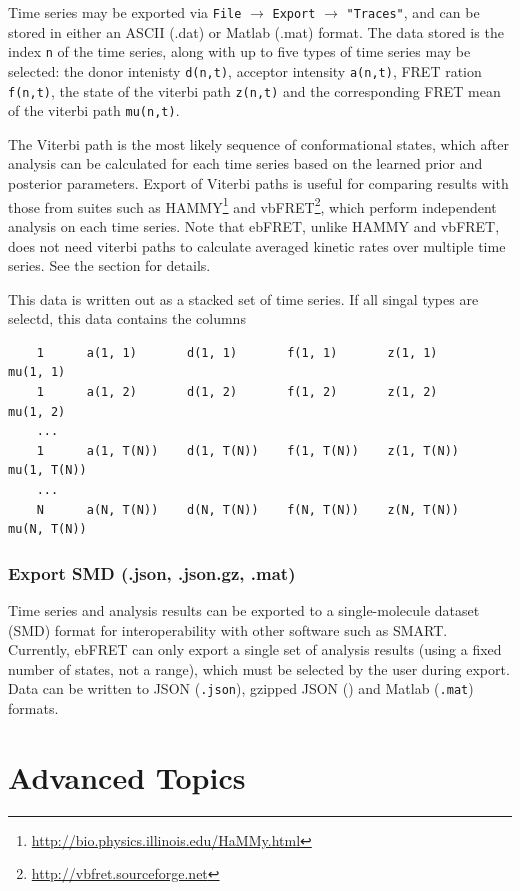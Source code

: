 \documentclass[12pt,article,oldfontcommands]{memoir}
\begin{document}
Time series may be exported via \texttt{File} $\to$ \texttt{Export} $\to$ \texttt{"Traces"}, and can be stored in either an ASCII (.dat) or Matlab (.mat) format. 
The data stored is the index \texttt{n} of the time series, along with up to five types of time series may be selected: the donor intenisty \texttt{d(n,t)}, acceptor intensity \texttt{a(n,t)}, FRET ration \texttt{f(n,t)}, the state of the viterbi path \texttt{z(n,t)} and the corresponding 
FRET mean of the viterbi path \texttt{mu(n,t)}. 

The Viterbi path is the most likely sequence of conformational states, which after analysis can be calculated for each time series based on the learned prior and posterior parameters. Export of Viterbi paths is useful for comparing results with those from suites such as HAMMY\footnote{\url{http://bio.physics.illinois.edu/HaMMy.html}} and vbFRET\footnote{\url{http://vbfret.sourceforge.net}}, which perform independent analysis on each time series. Note that ebFRET, unlike HAMMY and vbFRET, does not need viterbi paths to calculate averaged kinetic rates over multiple time series. See the \emph{} section for details.

This data is written out as a stacked set of time series. If all singal types are selectd, this data contains the columns

\begin{verbatim}
    1      a(1, 1)       d(1, 1)       f(1, 1)       z(1, 1)       mu(1, 1)
    1      a(1, 2)       d(1, 2)       f(1, 2)       z(1, 2)       mu(1, 2)
    ...
    1      a(1, T(N))    d(1, T(N))    f(1, T(N))    z(1, T(N))    mu(1, T(N))
    ...
    N      a(N, T(N))    d(N, T(N))    f(N, T(N))    z(N, T(N))    mu(N, T(N))
\end{verbatim}

\subsubsection{Export SMD (.json, .json.gz, .mat)}

 Time series and analysis results can be exported to a single-molecule dataset (SMD) format for interoperability with other software such as SMART. 
 Currently, ebFRET can only export a single set of analysis results (using a fixed number of states, not a range), which must be selected by the user during export.
 Data can be written to JSON (\texttt{.json}), gzipped JSON () and Matlab (\texttt{.mat}) formats.


\section{Advanced Topics}
\label{sec:advanced}
\end{document}
